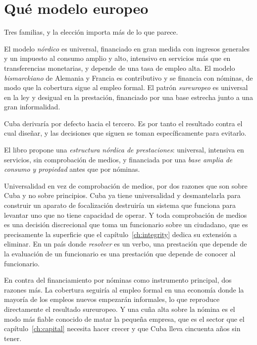 \section{Qué modelo europeo}

Tres familias, y la elección importa más de lo que parece.

El modelo \emph{nórdico} es universal, financiado en gran medida con ingresos
generales y un impuesto al consumo amplio y alto, intensivo en servicios más que en
transferencias monetarias, y depende de una tasa de empleo alta. El modelo
\emph{bismarckiano} de Alemania y Francia es contributivo y se financia con nóminas,
de modo que la cobertura sigue al empleo formal. El patrón \emph{sureuropeo} es
universal en la ley y desigual en la prestación, financiado por una base estrecha
junto a una gran informalidad.

Cuba derivaría por defecto hacia el tercero. Es por tanto el resultado contra el cual
diseñar, y las decisiones que siguen se toman específicamente para evitarlo.

El libro propone una \emph{estructura nórdica de prestaciones}: universal, intensiva
en servicios, sin comprobación de medios, y financiada por una \emph{base amplia de
consumo y propiedad} antes que por nóminas.

Universalidad en vez de comprobación de medios, por dos razones que son sobre Cuba y
no sobre principios. Cuba ya tiene universalidad y desmantelarla para construir un
aparato de focalización destruiría un sistema que funciona para levantar uno que no
tiene capacidad de operar. Y toda comprobación de medios es una decisión discrecional
que toma un funcionario sobre un ciudadano, que es precisamente la superficie que el
capítulo~\ref{ch:integrity} dedica su extensión a eliminar. En un país donde
\emph{resolver} es un verbo, una prestación que depende de la evaluación de un
funcionario es una prestación que depende de conocer al funcionario.

En contra del financiamiento por nóminas como instrumento principal, dos razones más.
La cobertura seguiría al empleo formal en una economía donde la mayoría de los empleos
nuevos empezarán informales, lo que reproduce directamente el resultado sureuropeo. Y
una cuña alta sobre la nómina es el modo más fiable conocido de matar la pequeña
empresa, que es el sector que el capítulo~\ref{ch:capital} necesita hacer crecer y que
Cuba lleva cincuenta años sin tener.


